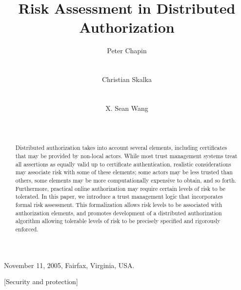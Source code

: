  {November 11, 2005, Fairfax, Virginia, USA.}



\title{Risk Assessment in Distributed Authorization}


\author{
\alignauthor Peter Chapin   \\
  \\
  \\
\alignauthor Christian Skalka   \\
  \\
  \\
\alignauthor X. Sean Wang \\
  \\
  \\
}

\maketitle

\begin{abstract} 
Distributed authorization takes into account several elements,
including certificates that may be provided by non-local actors.
While most trust management systems treat all assertions as equally
valid up to certificate authentication, realistic considerations may
associate risk with some of these elements; some actors may be less
trusted than others, some elements may be more computationally
expensive to obtain, and so forth.  Furthermore, practical online
authorization may require certain levels of risk to be tolerated. In
this paper, we introduce a trust management logic that incorporates
formal risk assessment.  This formalization allows risk levels to be
associated with authorization elements, and promotes development of a
distributed authorization algorithm allowing tolerable levels of risk
to be precisely specified and rigorously enforced.
\end{abstract}

[Security and protection]


